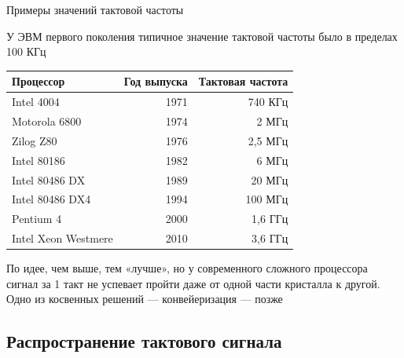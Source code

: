 \documentclass[xetex,aspectratio=43]{beamer}
\begin{document}
\begin{frame}{Примеры значений тактовой частоты}

        У ЭВМ первого поколения типичное значение тактовой частоты было в
        пределах 100 КГц

        \begin{center}
            \begin{tabular}[]{lrr}
                \hline
                Процессор & Год выпуска & Тактовая частота \\
                \hline
                Intel 4004 & 1971 & 740 КГц \\
                Motorola 6800 & 1974 & 2 МГц \\
                Zilog Z80 & 1976 & 2,5 МГц \\
                Intel 80186 & 1982 & 6 МГц \\
                Intel 80486 DX & 1989 & 20 МГц \\
                Intel 80486 DX4 & 1994 & 100 МГц \\
                Pentium 4 & 2000 & 1,6 ГГц \\
                Intel Xeon Westmere & 2010 & 3,6 ГГц \\
                \hline
            \end{tabular}
        \end{center}

        \pause

        По идее, чем выше, тем «лучше», но у современного сложного процессора
        сигнал за 1 такт не успевает пройти даже от одной части кристалла к другой. Одно из
        косвенных решений --- конвейеризация --- позже
\end{frame}

\subsection{Распространение тактового сигнала}
\end{document}
